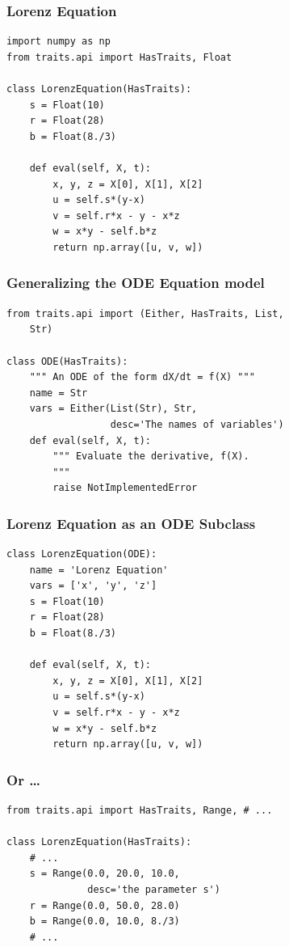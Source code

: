 \documentclass[14pt,compress]{beamer}
\begin{document}
\begin{frame}
    \frametitle{Lorenz Equation}
\small
\begin{lstlisting}
import numpy as np
from traits.api import HasTraits, Float

class LorenzEquation(HasTraits):
    s = Float(10)
    r = Float(28)
    b = Float(8./3)
    
    def eval(self, X, t):
        x, y, z = X[0], X[1], X[2]
        u = self.s*(y-x)
        v = self.r*x - y - x*z
        w = x*y - self.b*z
        return np.array([u, v, w])
\end{lstlisting}
\end{frame}

\begin{frame}
\frametitle{Generalizing the ODE Equation model}
\small
\begin{lstlisting}
from traits.api import (Either, HasTraits, List, 
    Str)

class ODE(HasTraits):
    """ An ODE of the form dX/dt = f(X) """
    name = Str
    vars = Either(List(Str), Str, 
                  desc='The names of variables')
    def eval(self, X, t):
        """ Evaluate the derivative, f(X). 
        """
        raise NotImplementedError
\end{lstlisting}
\end{frame}


\begin{frame}
\frametitle{Lorenz Equation as an ODE Subclass}
\small
\begin{lstlisting}
class LorenzEquation(ODE):
    name = 'Lorenz Equation'
    vars = ['x', 'y', 'z']
    s = Float(10)
    r = Float(28)
    b = Float(8./3)

    def eval(self, X, t):
        x, y, z = X[0], X[1], X[2]
        u = self.s*(y-x)
        v = self.r*x - y - x*z
        w = x*y - self.b*z
        return np.array([u, v, w])
\end{lstlisting}
\end{frame}

\begin{frame}
    \frametitle{Or \dots}
\small
\begin{lstlisting}
from traits.api import HasTraits, Range, # ...

class LorenzEquation(HasTraits):
    # ...
    s = Range(0.0, 20.0, 10.0, 
              desc='the parameter s')
    r = Range(0.0, 50.0, 28.0)
    b = Range(0.0, 10.0, 8./3)
    # ...
\end{lstlisting}
\end{frame}
\end{document}
